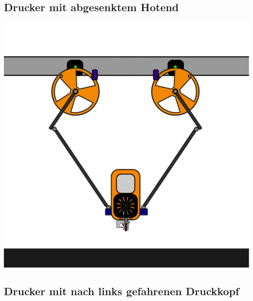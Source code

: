 \newpage %

\subsection{Drucker mit abgesenktem Hotend}


\begin{center}
  \includegraphics[scale=0.6]{./bilder/mydeltaDown.pdf}
\end{center}

\newpage %

\subsection{Drucker mit nach links gefahrenen Druckkopf }

